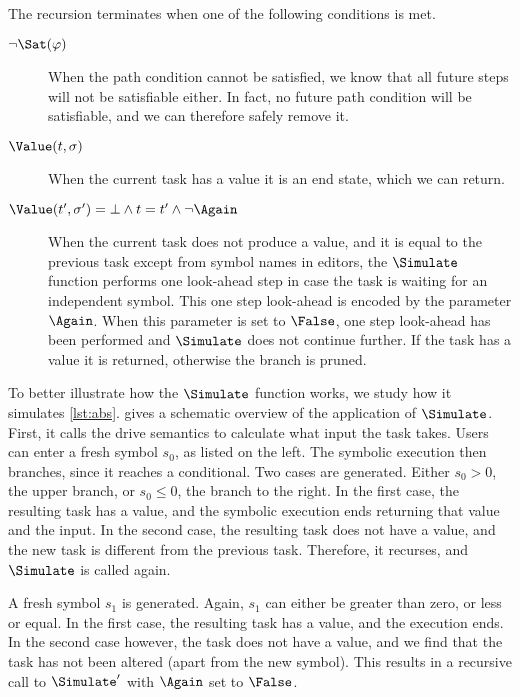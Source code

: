The recursion terminates when one of the following conditions is met.

\begin{description}
  \item[$\neg\Sat(\phi)$]
    When the path condition cannot be satisfied, we know that all future steps will not be satisfiable either.
    In fact, no future path condition will be satisfiable, and we can therefore safely remove it.

  \item[$\Value(t,\sigma)$]
    When the current task has a value it is an end state, which we can return.

  \item[$\Value(t',\sigma')=\bot\land t=t'\land \neg \Again$]
    When the current task does not produce a value, and it is equal to the previous task except from symbol names in editors, the $\Simulate$ function performs one look-ahead step in case the task is waiting for an independent symbol.
    This one step look-ahead is encoded by the parameter $\Again$.
    When this parameter is set to $\False$, one step look-ahead has been performed and $\Simulate$ does not continue further.
    If the task has a value it is returned, otherwise the branch is pruned.
\end{description}

To better illustrate how the $\Simulate$ function works, we study how it simulates \cref{lst:abs}.
 gives a schematic overview of the application of $\Simulate$.
First, it calls the drive semantics to calculate what input the task takes.
Users can enter a fresh symbol $s_0$, as listed on the left.
The symbolic execution then branches, since it reaches a conditional.
Two cases are generated. Either $s_0>0$, the upper branch, or $s_0\leq0$, the  branch to the right.
In the first case, the resulting task has a value, and the symbolic execution ends returning that value and the input.
In the second case, the resulting task does not have a value, and the new task is different from the previous task.
Therefore, it recurses, and $\Simulate$ is called again.

A fresh symbol $s_1$ is generated.
Again, $s_1$ can either be greater than zero, or less or equal.
In the first case, the resulting task has a value, and the execution ends.
In the second case however, the task does not have a value, and we find that the task has not been altered (apart from the new symbol).
This results in a recursive call to $\Simulate'$ with $\Again$ set to $\False$.


